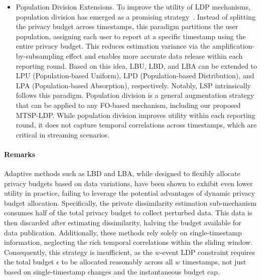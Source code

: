 \begin{itemize}

\item{Population Division Extensions.}
To improve the utility of LDP mechanisms, population division has emerged as a
promising strategy~\cite{Kulkarni2019,Wang2017l,Ren2022}.
Instead of splitting the privacy budget across timestamps, this paradigm
partitions the user population, assigning each user to report at a specific
timestamp using the entire privacy budget.
This reduces estimation variance via the amplification-by-subsampling effect and
enables more accurate data release within each reporting round.
Based on this idea, LBU, LBD, and LBA can be extended to LPU (Population-based
Uniform), LPD (Population-based Distribution), and LPA (Population-based
Absorption), respectively.
Notably, LSP intrinsically follows this paradigm.
Population division is a general augmentation strategy that can be applied to
any FO-based mechanism, including our proposed MTSP-LDP.
While population division improves utility within each reporting round, it does
not capture temporal correlations across timestamps, which are critical in
streaming scenarios.
\end{itemize}
\paragraph{Remarks}
Adaptive methods such as LBD and LBA, while designed to flexibly allocate
privacy budgets based on data variations, have been shown to exhibit even lower
utility in practice\cite{Schaler2024}, failing to leverage the potential
advantages of dynamic privacy budget allocation.
Specifically, the private dissimilarity estimation sub-mechanism consumes half
of the total privacy budget to collect perturbed data.
This data is then discarded after estimating dissimilarity, halving the budget
available for data publication.
Additionally, these methods rely solely on single-timestamp information,
neglecting the rich temporal correlations within the sliding window.
Consequently, this strategy is insufficient, as the $w$-event LDP constraint
requires the total budget $\epsilon$ to be allocated reasonably across all $w$
timestamps, not just based on single-timestamp changes and the instantaneous
budget cap.
